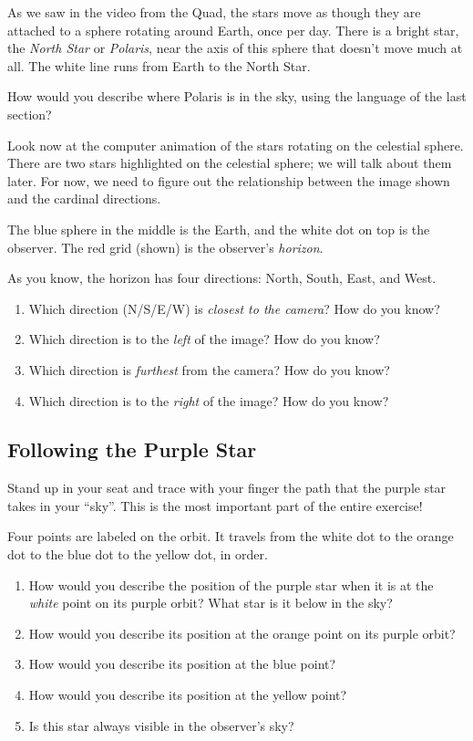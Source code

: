 \documentclass[12pt]{article}
\newcommand{\insp}{\vspace{1in}}
\newcommand{\BS}{\bigskip}
\begin{document}
As we saw in the video from the Quad, the stars move as though they are attached to a sphere rotating around Earth, once per day. There is a bright star, the {\it North Star} or {\it Polaris}, near the axis of this sphere that doesn't move much at all. The white line runs from Earth to the North Star.

How would you describe where Polaris is in the sky, using the language of the last section?

\BS\BS\BS\BS

Look now at the computer animation of the stars rotating on the celestial sphere. There are two stars highlighted on the celestial sphere; we will talk about them later. For now, we need to figure out the relationship between the image shown and the cardinal directions. 

The blue sphere in the middle is the Earth, and the white dot on top is the observer. The red grid (shown) is the observer's {\it horizon}. 

As you know, the horizon has four directions: North, South, East, and West.

\begin{enumerate}
	\item Which direction (N/S/E/W) is {\it closest to the camera}? How do you know?
	\insp
	\item Which direction is to the {\it left} of the image? How do you know?
	\insp
	
	\item Which direction is {\it furthest} from the camera? How do you know?
	\insp
	\item Which direction is to the {\it right} of the image? How do you know?
	\insp
\end{enumerate}

\subsection{Following the Purple Star}

Stand up in your seat and trace with your finger the path that the purple star takes in your ``sky''. This is the most important part of the entire exercise! 

Four points are labeled on the orbit. It travels from the white dot to the orange dot to the blue dot to the yellow dot, in order.

\begin{enumerate}
	\item How would you describe the position of the purple star when it is at the {\it white} point on its purple orbit? What star is it below in the sky?
	
	\BS\BS\BS
	
	\item How would you describe its position at the orange point on its purple orbit?
	\BS\BS\BS	
	\item How would you describe its position at the blue point? 
		\BS\BS\BS
	\item How would you describe its position at the yellow point?
		\BS\BS\BS
		
		\item Is this star always visible in the observer's sky?
\end{enumerate}
\end{document}
